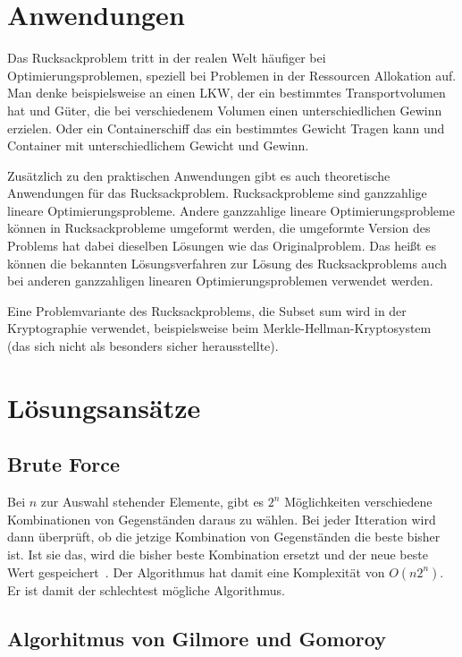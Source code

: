 \documentclass[12pt, a4paper, ngerman]{article}
\begin{document}
\section{Anwendungen}

Das Rucksackproblem tritt in der realen Welt häufiger bei Optimierungsproblemen,
speziell bei Problemen in der Ressourcen Allokation auf.
Man denke beispielsweise an einen LKW, der ein bestimmtes Transportvolumen hat und Güter,
die bei verschiedenem Volumen einen unterschiedlichen Gewinn erzielen.
Oder ein Containerschiff das ein bestimmtes Gewicht Tragen kann
und Container mit unterschiedlichem Gewicht und Gewinn.

Zusätzlich zu den praktischen Anwendungen gibt es auch theoretische Anwendungen für das Rucksackproblem.
Rucksackprobleme sind ganzzahlige lineare Optimierungsprobleme.
Andere ganzzahlige lineare Optimierungsprobleme können in Rucksackprobleme umgeformt werden\cite{mainKnapsack},
die umgeformte Version des Problems hat dabei dieselben Lösungen wie das Originalproblem\cite{mainKnapsack}.
Das heißt es können die bekannten Lösungsverfahren zur Lösung des Rucksackproblems
auch bei anderen ganzzahligen linearen Optimierungsproblemen verwendet werden.

Eine Problemvariante des Rucksackproblems, die Subset sum wird in der Kryptographie verwendet,
beispielsweise beim Merkle-Hellman-Kryptosystem (das sich nicht als besonders sicher herausstellte).

\section{Lösungsansätze}

\subsection{Brute Force}

Bei \(n\) zur Auswahl stehender Elemente, gibt es \(2^n\) Möglichkeiten verschiedene Kombinationen von Gegenständen daraus zu wählen.
Bei jeder Itteration wird dann überprüft,
ob die jetzige Kombination von Gegenständen die beste bisher ist.
Ist sie das, wird die bisher beste Kombination ersetzt und der neue beste Wert gespeichert~\cite{paper102}.
Der Algorithmus hat damit eine Komplexität von \(O(n2^n)\).
Er ist damit der schlechtest mögliche Algorithmus.

\subsection{Algorhitmus von Gilmore und Gomoroy}
\end{document}
